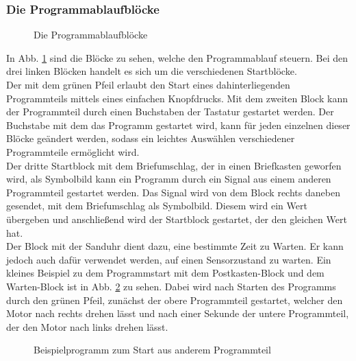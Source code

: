 \subsubsection{Die Programmablaufblöcke}
\begin{figure}[htbp!]
	\centering
	\caption[Die Programmablaufblöcke]{Die Programmablaufblöcke} %
	\label{img:Programmablaufblöcke}
\end{figure}
In Abb. \ref{img:Programmablaufblöcke} sind die Blöcke zu sehen, welche den Programmablauf steuern. Bei den drei linken Blöcken handelt es sich um die verschiedenen Startblöcke.\\
Der mit dem grünen Pfeil erlaubt den Start eines dahinterliegenden Programmteils mittels eines einfachen Knopfdrucks. Mit dem zweiten Block kann der Programmteil durch einen Buchstaben der Tastatur gestartet werden. Der Buchstabe mit dem das Programm gestartet wird, kann für jeden einzelnen dieser Blöcke geändert werden, sodass ein leichtes Auswählen verschiedener Programmteile ermöglicht wird.\\
Der dritte Startblock mit dem Briefumschlag, der in einen Briefkasten geworfen wird, als Symbolbild kann ein Programm durch ein Signal aus einem anderen Programmteil gestartet werden. Das Signal wird von dem Block rechts daneben gesendet, mit dem Briefumschlag als Symbolbild. Diesem wird ein Wert übergeben und anschließend wird der Startblock gestartet, der den gleichen Wert hat. \\
Der Block mit der Sanduhr dient dazu, eine bestimmte Zeit zu Warten. Er kann jedoch auch dafür verwendet werden, auf einen Sensorzustand zu warten. Ein kleines Beispiel zu dem Programmstart mit dem Postkasten-Block und dem Warten-Block ist in Abb. \ref{img:Beispiel_01} zu sehen. Dabei wird nach Starten des Programms durch den grünen Pfeil, zunächst der obere Programmteil gestartet, welcher den Motor nach rechts drehen lässt und nach einer Sekunde der untere Programmteil, der den Motor nach links drehen lässt. 



\begin{figure}[htbp!]
	\centering
	\caption[Beispielprogramm zum Start aus anderem Programmteil]{Beispielprogramm zum Start aus anderem Programmteil} %
	\label{img:Beispiel_01}
\end{figure}

